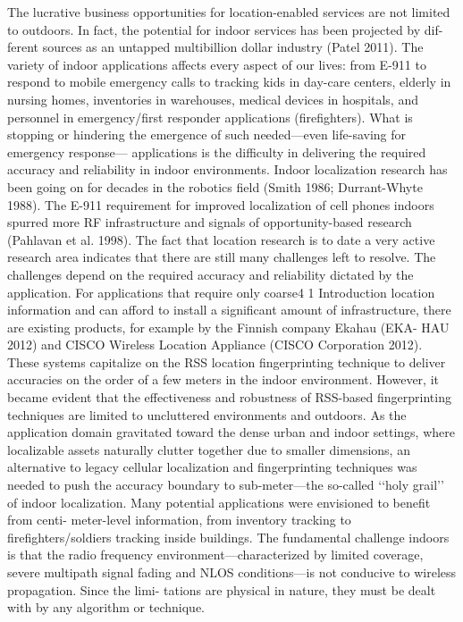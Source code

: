 The lucrative business opportunities for location-enabled services are not limited
to outdoors. In fact, the potential for indoor services has been projected by dif-
ferent sources as an untapped multibillion dollar industry (Patel 2011). The variety
of indoor applications affects every aspect of our lives: from E-911 to respond to
mobile emergency calls to tracking kids in day-care centers, elderly in nursing
homes, inventories in warehouses, medical devices in hospitals, and personnel in
emergency/first responder applications (firefighters). What is stopping or hindering
the emergence of such needed—even life-saving for emergency response—
applications is the difficulty in delivering the required accuracy and reliability in
indoor environments. Indoor localization research has been going on for decades
in the robotics field (Smith 1986; Durrant-Whyte 1988). The E-911 requirement
for improved localization of cell phones indoors spurred more RF infrastructure
and signals of opportunity-based research (Pahlavan et al. 1998). The fact that
location research is to date a very active research area indicates that there are still
many challenges left to resolve. The challenges depend on the required accuracy
and reliability dictated by the application. For applications that require only coarse4
1 Introduction
location information and can afford to install a significant amount of infrastructure,
there are existing products, for example by the Finnish company Ekahau (EKA-
HAU 2012) and CISCO Wireless Location Appliance (CISCO Corporation 2012).
These systems capitalize on the RSS location fingerprinting technique to deliver
accuracies on the order of a few meters in the indoor environment. However, it
became evident that the effectiveness and robustness of RSS-based fingerprinting
techniques are limited to uncluttered environments and outdoors.
As the application domain gravitated toward the dense urban and indoor settings,
where localizable assets naturally clutter together due to smaller dimensions, an
alternative to legacy cellular localization and fingerprinting techniques was needed
to push the accuracy boundary to sub-meter—the so-called ‘‘holy grail’’ of indoor
localization. Many potential applications were envisioned to benefit from centi-
meter-level information, from inventory tracking to firefighters/soldiers tracking
inside buildings. The fundamental challenge indoors is that the radio frequency
environment—characterized by limited coverage, severe multipath signal fading
and NLOS conditions—is not conducive to wireless propagation. Since the limi-
tations are physical in nature, they must be dealt with by any algorithm or technique.
